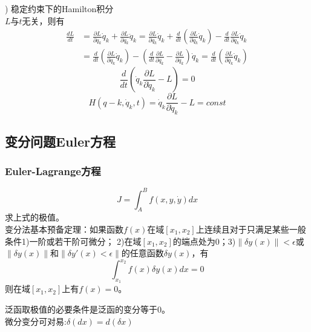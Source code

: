 \documentclass[12pt]{article}
\numberwithin{equation}{section}
\begin{document}
        ) 稳定约束下的Hamilton积分\\
        $L$与$t$无关，则有
        \begin{equation}
            \begin{aligned}
                \frac{dL}{dt}&=\frac{\partial L}{\partial q_k}\dot{q}_k+\frac{\partial L}{\partial q_k}\ddot{q}_k
                =\frac{\partial L}{\partial q_k}\dot{q}_k+\frac{d}{dt}\left( \frac{\partial L}{\partial \dot{q}_k}\dot{q}_k \right)
                -\frac{d}{dt}\frac{\partial L}{\partial q_k}\dot{q}_k\\
                &=\frac{d}{dt}\left( \frac{\partial L}{\partial \dot{q}_k}\dot{q}_k \right)
                -\left( \frac{d}{dt}\frac{\partial L}{\partial q_k}-\frac{\partial L}{\partial q_k} \right)\dot{q}_k
                =\frac{d}{dt}\left( \frac{\partial L}{\partial \dot{q}_k}\dot{q}_k \right)
            \end{aligned}
        \end{equation}
        \begin{equation}
           \frac{d}{dt}\left( \dot{q}_k\frac{\partial L}{\partial \dot{q}_k}-L \right)=0 
        \end{equation}
        \begin{equation}
           H(q-k,\dot{q}_k,t)=\dot{q}_k\frac{\partial L}{\partial \dot{q}_k}-L=const 
        \end{equation}

        \subsection{变分问题Euler方程}
        \subsubsection{Euler-Lagrange方程}
        \begin{equation}
            J=\int_A^Bf(x,y,\dot{y})dx
        \end{equation}
        求上式的极值。\\
        变分法基本预备定理：如果函数$f(x)$在域$[x_1,x_2]$上连续且对于只满足某些一般条件1)一阶或若干阶可微分；
        2)在域$[x_1,x_2]$的端点处为0；3)$\|\delta y(x)\|<\epsilon$或
        $\|\delta y(x)\|$和$\|\delta y'(x)<\epsilon\|$的任意函数$\delta y(x)$，有
        $$\int_{x_1}^{x_2}f(x)\delta y(x)dx=0$$
        则在域$[x_1,x_2]$上有$f(x)=0$。

        \noindent 泛函取极值的必要条件是泛函的变分等于0。\\
        微分变分可对易:$\delta(dx)=d(\delta x)$
\end{document}
